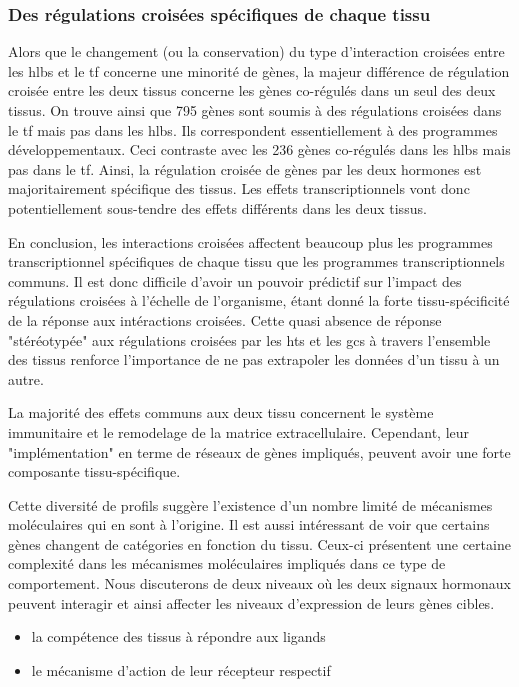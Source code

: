 \documentclass[../main.tex]{subfiles}
\begin{document}
\subsubsection{Des régulations croisées spécifiques de chaque tissu}
Alors que le changement (ou la conservation) du type d'interaction croisées entre les \glspl{hlb} et le \gls{tf} concerne une minorité de gènes, la majeur différence de régulation croisée entre les deux tissus concerne les gènes co-régulés dans un seul des deux tissus.
On trouve ainsi que 795 gènes sont soumis à des régulations croisées dans le \gls{tf} mais pas dans les \glspl{hlb}.
Ils correspondent essentiellement à des programmes développementaux.
Ceci contraste avec les 236 gènes co-régulés dans les \glspl{hlb} mais pas dans le \gls{tf}.
Ainsi, la régulation croisée de gènes par les deux hormones est majoritairement spécifique des tissus.
Les effets transcriptionnels vont donc potentiellement sous-tendre des effets différents dans les deux tissus.
\\
\par
En conclusion, les interactions croisées affectent beaucoup plus les programmes transcriptionnel spécifiques de chaque tissu que les programmes transcriptionnels communs.
Il est donc difficile d'avoir un pouvoir prédictif sur l'impact des régulations croisées à l'échelle de l'organisme, étant donné la forte tissu-spécificité de la réponse aux intéractions croisées.
Cette quasi absence de réponse "stéréotypée" aux régulations croisées par les \glspl{ht} et les \glspl{gc} à travers l'ensemble des tissus renforce l'importance de ne pas extrapoler les données d'un tissu à un autre.
\par
La majorité des effets communs aux deux tissu concernent le système immunitaire et le remodelage de la matrice extracellulaire.
Cependant, leur "implémentation" en terme de réseaux de gènes impliqués, peuvent avoir une forte composante tissu-spécifique.
\\
\par
Cette diversité de profils suggère l'existence d'un nombre limité de mécanismes moléculaires qui en sont à l'origine.
Il est aussi intéressant de voir que certains gènes changent de catégories en fonction du tissu.
Ceux-ci présentent une certaine complexité dans les mécanismes moléculaires impliqués dans ce type de comportement.
Nous discuterons de deux niveaux où les deux signaux hormonaux peuvent interagir et ainsi affecter les niveaux d'expression de leurs gènes cibles.
\begin{itemize}
\item la compétence des tissus à répondre aux ligands
\item le mécanisme d'action de leur récepteur respectif
\end{itemize}
\end{document}
